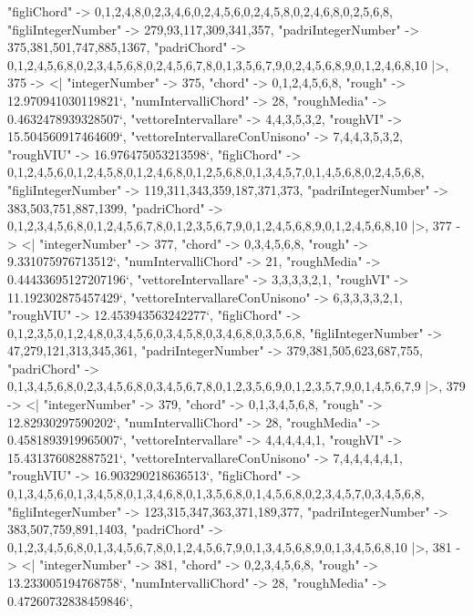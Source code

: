 \documentclass[
]{article}
\begin{document}
\begin{DatasetVerbatim}
    "figliChord" -> {{0,1,2,4,8},{0,2,3,4,6},{0,2,4,5,6},{0,2,4,5,8},{0,2,4,6,8},{0,2,5,6,8}},
    "figliIntegerNumber" -> {279,93,117,309,341,357},
    "padriIntegerNumber" -> {375,381,501,747,885,1367},
    "padriChord" -> {{0,1,2,4,5,6,8},{0,2,3,4,5,6,8},{0,2,4,5,6,7,8},{0,1,3,5,6,7,9},{0,2,4,5,6,8,9},{0,1,2,4,6,8,10}}
  |>,
  375 -> <|
    "integerNumber" -> 375,
    "chord" -> {0,1,2,4,5,6,8},
    "rough" -> 12.970941030119821`,
    "numIntervalliChord" -> 28,
    "roughMedia" -> 0.4632478939328507`,
    "vettoreIntervallare" -> {4,4,3,5,3,2},
    "roughVI" -> 15.504560917464609`,
    "vettoreIntervallareConUnisono" -> {7,4,4,3,5,3,2},
    "roughVIU" -> 16.976475053213598`,
    "figliChord" -> {{0,1,2,4,5,6},{0,1,2,4,5,8},{0,1,2,4,6,8},{0,1,2,5,6,8},{0,1,3,4,5,7},{0,1,4,5,6,8},{0,2,4,5,6,8}},
    "figliIntegerNumber" -> {119,311,343,359,187,371,373},
    "padriIntegerNumber" -> {383,503,751,887,1399},
    "padriChord" -> {{0,1,2,3,4,5,6,8},{0,1,2,4,5,6,7,8},{0,1,2,3,5,6,7,9},{0,1,2,4,5,6,8,9},{0,1,2,4,5,6,8,10}}
  |>,
  377 -> <|
    "integerNumber" -> 377,
    "chord" -> {0,3,4,5,6,8},
    "rough" -> 9.331075976713512`,
    "numIntervalliChord" -> 21,
    "roughMedia" -> 0.44433695127207196`,
    "vettoreIntervallare" -> {3,3,3,3,2,1},
    "roughVI" -> 11.192302875457429`,
    "vettoreIntervallareConUnisono" -> {6,3,3,3,3,2,1},
    "roughVIU" -> 12.453943563242277`,
    "figliChord" -> {{0,1,2,3,5},{0,1,2,4,8},{0,3,4,5,6},{0,3,4,5,8},{0,3,4,6,8},{0,3,5,6,8}},
    "figliIntegerNumber" -> {47,279,121,313,345,361},
    "padriIntegerNumber" -> {379,381,505,623,687,755},
    "padriChord" -> {{0,1,3,4,5,6,8},{0,2,3,4,5,6,8},{0,3,4,5,6,7,8},{0,1,2,3,5,6,9},{0,1,2,3,5,7,9},{0,1,4,5,6,7,9}}
  |>,
  379 -> <|
    "integerNumber" -> 379,
    "chord" -> {0,1,3,4,5,6,8},
    "rough" -> 12.82930297590202`,
    "numIntervalliChord" -> 28,
    "roughMedia" -> 0.4581893919965007`,
    "vettoreIntervallare" -> {4,4,4,4,4,1},
    "roughVI" -> 15.431376082887521`,
    "vettoreIntervallareConUnisono" -> {7,4,4,4,4,4,1},
    "roughVIU" -> 16.903290218636513`,
    "figliChord" -> {{0,1,3,4,5,6},{0,1,3,4,5,8},{0,1,3,4,6,8},{0,1,3,5,6,8},{0,1,4,5,6,8},{0,2,3,4,5,7},{0,3,4,5,6,8}},
    "figliIntegerNumber" -> {123,315,347,363,371,189,377},
    "padriIntegerNumber" -> {383,507,759,891,1403},
    "padriChord" -> {{0,1,2,3,4,5,6,8},{0,1,3,4,5,6,7,8},{0,1,2,4,5,6,7,9},{0,1,3,4,5,6,8,9},{0,1,3,4,5,6,8,10}}
  |>,
  381 -> <|
    "integerNumber" -> 381,
    "chord" -> {0,2,3,4,5,6,8},
    "rough" -> 13.233005194768758`,
    "numIntervalliChord" -> 28,
    "roughMedia" -> 0.47260732838459846`,

\end{DatasetVerbatim}
\end{document}
